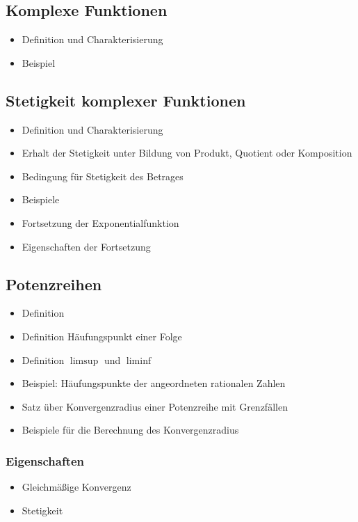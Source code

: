 \documentclass[8pt,a4paper,fleqn]{article}
\begin{document}
\begin{multicols}{2}
  \subsection{Komplexe Funktionen} %
  \label{sub:komplexe_funktionen}
  \begin{itemize}
    \item Definition und Charakterisierung
    \item Beispiel
  \end{itemize}

  \subsection{Stetigkeit komplexer Funktionen} %
  \label{sub:stetigkeit_komplexer_funktionen}
  \begin{itemize}
    \item Definition und Charakterisierung
    \item Erhalt der Stetigkeit unter Bildung von Produkt, Quotient oder Komposition
    \item Bedingung für Stetigkeit des Betrages
    \item Beispiele
    \item Fortsetzung der Exponentialfunktion
    \item Eigenschaften der Fortsetzung
  \end{itemize}

  \subsection{Potenzreihen} %
  \label{sub:potenzreihen}
  \begin{itemize}
    \item Definition
    \item Definition Häufungspunkt einer Folge
    \item Definition $\limsup$ und $\liminf$
    \item Beispiel: Häufungspunkte der angeordneten rationalen Zahlen
    \item Satz über Konvergenzradius einer Potenzreihe mit Grenzfällen
    \item Beispiele für die Berechnung des Konvergenzradius
  \end{itemize}
  \subsubsection{Eigenschaften} %
  \label{ssub:eigenschaften}
  \begin{itemize}
    \item Gleichmäßige Konvergenz
    \item Stetigkeit
  \end{itemize}


\end{multicols}
\end{document}
